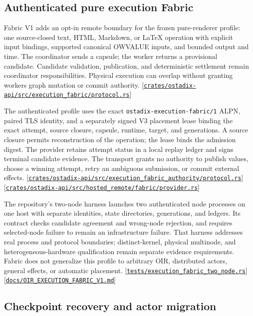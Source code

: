 \documentclass[11pt,oneside]{article}
\newcommand{\src}[1]{\textcolor{OSlate}{\scriptsize[\href{https://github.com/lostadi/OSTADIX/blob/c0b02c326b2329a95ba52447c7180bc93957cd57/#1}{\nolinkurl{#1}}]}\allowbreak}
\begin{document}
\subsection{Authenticated pure execution Fabric}

Fabric V1 adds an opt-in remote boundary for the frozen pure-renderer profile:
one source-closed text, HTML, Markdown, or LaTeX operation with explicit input
bindings, supported canonical OWVALUE inputs, and bounded output and time.
The coordinator sends a capsule; the worker returns a provisional candidate.
Candidate validation, publication, and deterministic settlement remain
coordinator responsibilities. Physical execution can overlap without granting
workers graph mutation or commit authority.
\src{crates/ostadix-api/src/execution_fabric/protocol.rs}

The authenticated profile uses the exact
\texttt{ostadix-execution-fabric/1} ALPN, paired TLS identity, and a separately
signed V3 placement lease binding the exact attempt, source closure, capsule,
runtime, target, and generations. A source closure permits reconstruction of
the operation; the lease binds the admission digest. The provider retains
attempt status in a local replay ledger and signs terminal candidate evidence.
The transport grants no authority to publish values, choose a winning attempt,
retry an ambiguous submission, or commit external effects.
\src{crates/ostadix-api/src/execution_fabric_authority/protocol.rs}
\src{crates/ostadix-api/src/hosted_remote/fabric/provider.rs}

The repository's two-node harness launches two authenticated node processes
on one host with separate identities, state directories, generations, and
ledgers. Its contract checks candidate agreement and wrong-node rejection,
and requires selected-node failure to remain an infrastructure failure.
That harness addresses real process and protocol boundaries; distinct-kernel,
physical multinode, and heterogeneous-hardware qualification remain separate
evidence requirements. Fabric does not generalize this profile to arbitrary
OIR, distributed actors, general effects, or automatic placement.
\src{tests/execution_fabric_two_node.rs}
\src{docs/OIR_EXECUTION_FABRIC_V1.md}

\subsection{Checkpoint recovery and actor migration}
\end{document}
